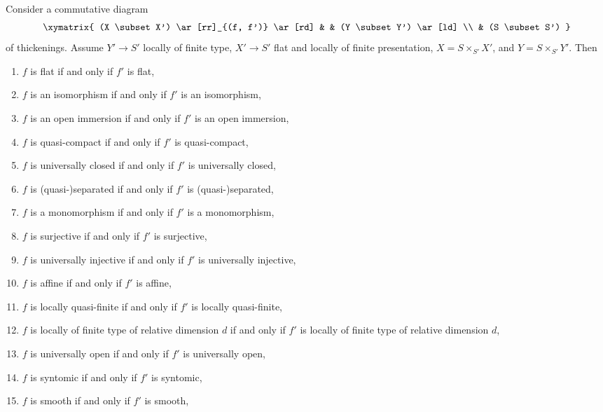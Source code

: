 \begin{lemma}
\label{lemma-deform-property-fp-over-ft}
Consider a commutative diagram
$$
\xymatrix{
(X \subset X') \ar[rr]_{(f, f')} \ar[rd] & & (Y \subset Y') \ar[ld] \\
& (S \subset S')
}
$$
of thickenings. Assume $Y' \to S'$ locally of finite type,
$X' \to S'$ flat and locally of finite presentation,
$X = S \times_{S'} X'$, and $Y = S \times_{S'} Y'$. Then
\begin{enumerate}
\item $f$ is flat if and only if $f'$ is flat,
\label{item-flat-fp-over-ft}
\item $f$ is an isomorphism if and only if $f'$ is an isomorphism,
\label{item-isomorphism-fp-over-ft}
\item $f$ is an open immersion if and only if $f'$ is an open immersion,
\label{item-open-immersion-fp-over-ft}
\item $f$ is quasi-compact if and only if $f'$ is quasi-compact,
\label{item-quasi-compact-fp-over-ft}
\item $f$ is universally closed if and only if $f'$ is universally closed,
\label{item-universally-closed-fp-over-ft}
\item $f$ is (quasi-)separated if and only if $f'$ is (quasi-)separated,
\label{item-separated-fp-over-ft}
\item $f$ is a monomorphism if and only if $f'$ is a monomorphism,
\label{item-monomorphism-fp-over-ft}
\item $f$ is surjective if and only if $f'$ is surjective,
\label{item-surjective-fp-over-ft}
\item $f$ is universally injective if and only if $f'$ is universally injective,
\label{item-universally-injective-fp-over-ft}
\item $f$ is affine if and only if $f'$ is affine,
\label{item-affine-fp-over-ft}
\item $f$ is locally quasi-finite if and only if $f'$ is locally quasi-finite,
\label{item-quasi-finite-fp-over-ft}
\item
\label{item-relative-dimension-d-fp-over-ft}
$f$ is locally of finite type of relative dimension $d$ if and only if
$f'$ is locally of finite type of relative dimension $d$,
\item $f$ is universally open if and only if $f'$ is universally open,
\label{item-universally-open-fp-over-ft}
\item $f$ is syntomic if and only if $f'$ is syntomic,
\label{item-syntomic-fp-over-ft}
\item $f$ is smooth if and only if $f'$ is smooth,

\end{enumerate}
\end{lemma}
